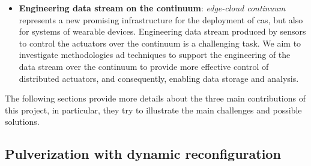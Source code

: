 \documentclass[12pt]{article}
\begin{document}
{\begin{itemize}
	\item \textbf{Engineering data stream on the continuum}: \emph{edge-cloud continuum} represents a new promising infrastructure for the deployment of \ac{cas},
		but also for systems of wearable devices.
		Engineering data stream produced by sensors to control the actuators over the continuum is a challenging task.
		We aim to investigate methodologies ad techniques to support the engineering of the data stream over the continuum to provide more effective control of distributed actuators,
		and consequently,
		enabling data storage and analysis.
\end{itemize}

The following sections provide more details about the three main contributions of this project,
in particular,
they try to illustrate the main challenges and possible solutions.
}
\subsection{Pulverization with dynamic reconfiguration}\label{sec:pulv-dyn}
\end{document}
